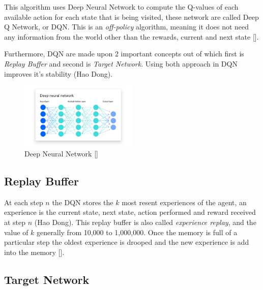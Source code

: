 \documentclass[12pt]{article}
\begin{document}
This algorithm uses Deep Neural Network to compute the Q-values of each available action for each state that is being visited, these network are called Deep Q Network, or DQN. This is an \textit{off-policy} algorithm, meaning it does not need any information from the world other than the rewards, current and next state [\cite{laura}].

Furthermore, DQN are made upon 2 important concepts out of which first is \textit{Replay Buffer} and second is \textit{Target Network}. Using both approach in DQN improves it's stability (Hao Dong).

\begin{figure}[H]
\centering
  \includegraphics[width=0.5\textwidth]{images/dnn.png}
  \caption{Deep Neural Network [\cite{ibm}]}
  \label{dnn}
\end{figure}

\subsection{Replay Buffer}

At each step $n$ the DQN stores the $k$ most resent experiences of the agent, an experience is the current state, next state, action performed and reward received at step $n$ (Hao Dong). This replay buffer is also called \textit{experience replay}, and the value of $k$ generally from 10,000 to 1,000,000. Once the memory is full of a particular step the oldest experience is drooped and the new experience is add into the memory [\cite{laura}].

\subsection{Target Network}
\end{document}
